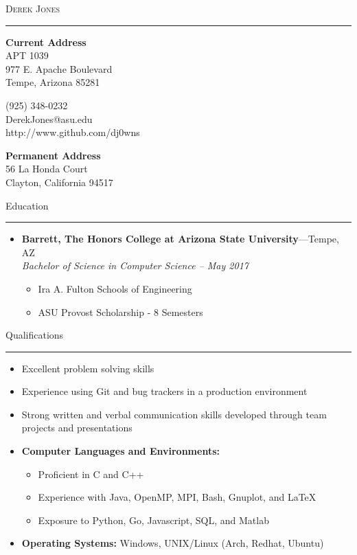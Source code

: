 \documentclass[10pt,oneside]{article}
\makeatletter
\newcommand{\name}{Derek Jones}
\newcommand{\homeaddrtop}{56 La Honda Court}
\newcommand{\homeaddrbot}{Clayton, California 94517}
\newcommand{\schooladdrtop}{APT 1039}
\newcommand{\schooladdrmid}{977 E. Apache Boulevard}
\newcommand{\schooladdrbot}{Tempe, Arizona 85281}
\newcommand{\cellphone}{(925) 348-0232}
\newcommand{\email}{DerekJones@asu.edu}
\newcommand{\github}{http://www.github.com/dj0wns}
\newcommand{\bigname}[1]{
	\begin{center}\huge\scshape#1\end{center}
}
\newcommand{\sectitle}[1]{
	\begin{flushleft}{\selectfont\Large#1}\end{flushleft}
}
\newenvironment{ressection}[1]{
	\vspace{2pt}
	\sectitle{#1}
	\vspace{-10pt}\rule{\textwidth}{0.5pt}
	\vspace{-10pt}
	\begin{itemize}
	\vspace{3pt}
}{
	\end{itemize}
}
\newcommand{\resitem}[1]{
	\vspace{-4pt}
	\item \begin{flushleft} #1 \end{flushleft}
}
\newcommand{\ressubitem}[1]{
	\vspace{-1pt}
	\item \begin{flushleft} #1 \end{flushleft}
}
\newcommand{\resbigitem}[3]{
	\vspace{-5pt}
	\item
	\textbf{#1}---#2 \\
	\textit{#3}
}
\newenvironment{ressubsec}[3]{
	\resbigitem{#1}{#2}{#3}
	\vspace{-4pt}
	\begin{itemize}
}{
	\end{itemize}
}
\newenvironment{reslist}[1]{
	\resitem{\textbf{#1}}
	\vspace{-5pt}
	\begin{itemize}
}{
	\end{itemize}
}
\makeatother
\begin{document}
 \selectfont

\bigname{\name}
\vspace{-6pt} \rule{\textwidth}{1pt}
\vspace{-22pt}
\begin{multicols}{3}
	
	{\bfseries Current Address}\\
	\schooladdrtop \\
	\schooladdrmid \\
	\schooladdrbot \\
	
	\columnbreak
	\begin{center}
		\cellphone \\
		\email\\
		\github\\
	\end{center}
	
	\columnbreak
	\begin{flushright}
	{\bfseries Permanent Address}\\
	\homeaddrtop\\
	\homeaddrbot\\
	\end{flushright}

\end{multicols}

\vspace{-24 pt}




\vspace{\baselineskip}
\begin{ressection}{Education}
	\begin{ressubsec}{Barrett, The Honors College at Arizona State University}{Tempe, AZ}{Bachelor of Science in Computer Science -- May 2017}
		\ressubitem{Ira A. Fulton Schools of Engineering}
		\ressubitem{ASU Provost Scholarship - 8 Semesters}
	\end{ressubsec}
\end{ressection}


\begin{ressection}{Qualifications}
	\resitem{Excellent problem solving skills}

	\resitem{Experience using Git and bug trackers in a production environment}

	\resitem{Strong written and verbal communication skills developed through team projects and presentations}

	\begin{reslist}{Computer Languages and Environments:}
		\ressubitem{Proficient in C and C++}
		\ressubitem{Experience with Java, OpenMP, MPI, Bash, Gnuplot, and LaTeX}
		\ressubitem{Exposure to Python, Go, Javascript, SQL, and Matlab}
	\end{reslist}

	\resitem{\textbf{Operating Systems:} Windows,
	UNIX/Linux (Arch, Redhat, Ubuntu)}

\end{ressection}
\end{document}
